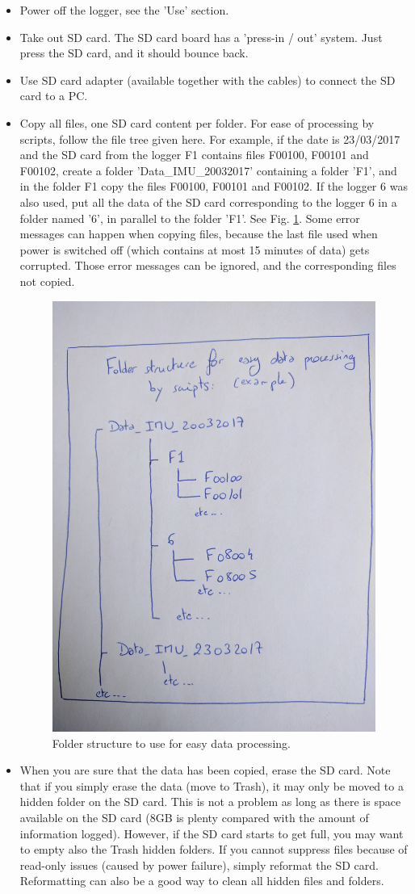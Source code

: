 \documentclass[pdftex,a4paper,12pt,twocolumn,fleqn,captions=tableheading]{scrartcl}
\begin{document}
\begin{itemize}
  \item Power off the logger, see the 'Use' section.

  \item Take out SD card. The SD card board has a 'press-in / out' system. Just press the SD card, and it should bounce back.

  \item Use SD card adapter (available together with the cables) to connect the SD card to a PC.

  \item Copy all files, one SD card content per folder. For ease of processing by scripts, follow the file tree given here. For example, if the date is 23/03/2017 and the SD card from the logger F1 contains files F00100, F00101 and F00102, create a folder 'Data\_IMU\_20032017' containing a folder 'F1', and in the folder F1 copy the files F00100, F00101 and F00102. If the logger 6 was also used, put all the data of the SD card corresponding to the logger 6 in a folder named '6', in parallel to the folder 'F1'. See Fig. \ref{folderstruct}. Some error messages can happen when copying files, because the last file used when power is switched off (which contains at most 15 minutes of data) gets corrupted. Those error messages can be ignored, and the corresponding files not copied.

  \begin{figure}
  \begin{center}
  \includegraphics[width=.4\textwidth]{Figures/IMG_20170418_135351}
  \caption{\label{folderstruct} Folder structure to use for easy data processing.}
  \end{center}
  \end{figure}

  \item When you are sure that the data has been copied, erase the SD card. Note that if you simply erase the data (move to Trash), it may only be moved to a hidden folder on the SD card. This is not a problem as long as there is space available on the SD card (8GB is plenty compared with the amount of information logged). However, if the SD card starts to get full, you may want to empty also the Trash hidden folders. If you cannot suppress files because of read-only issues (caused by power failure), simply reformat the SD card. Reformatting can also be a good way to clean all hidden files and folders.


\end{itemize}
\end{document}
